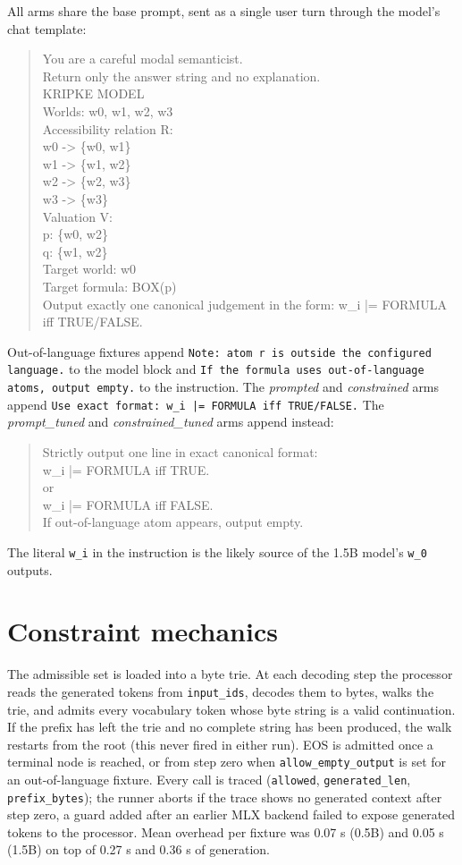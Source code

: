 \documentclass[11pt]{article}
\begin{document}
All arms share the base prompt, sent as a single user turn through the model's chat template:
\begin{quote}\small\ttfamily\raggedright\sloppy
You are a careful modal semanticist.\\
Return only the answer string and no explanation.\\[3pt]
KRIPKE MODEL\\
Worlds: w0, w1, w2, w3\\
Accessibility relation R:\\
w0 -> \{w0, w1\}\\
w1 -> \{w1, w2\}\\
w2 -> \{w2, w3\}\\
w3 -> \{w3\}\\[3pt]
Valuation V:\\
p: \{w0, w2\}\\
q: \{w1, w2\}\\[3pt]
Target world: w0\\
Target formula: BOX(p)\\[3pt]
Output exactly one canonical judgement in the form: w\_i |= FORMULA iff TRUE/FALSE.
\end{quote}
Out-of-language fixtures append \texttt{Note: atom r is outside the configured language.} to the model block and \texttt{If the formula uses out-of-language atoms, output empty.} to the instruction. The \emph{prompted} and \emph{constrained} arms append \texttt{Use exact format: w\_i |= FORMULA iff TRUE/FALSE.} The \emph{prompt\_tuned} and \emph{constrained\_tuned} arms append instead:
\begin{quote}\small\ttfamily\raggedright\sloppy
Strictly output one line in exact canonical format:\\
w\_i |= FORMULA iff TRUE.\\
or\\
w\_i |= FORMULA iff FALSE.\\
If out-of-language atom appears, output empty.
\end{quote}
The literal \texttt{w\_i} in the instruction is the likely source of the 1.5B model's \texttt{w\_0} outputs.

\section{Constraint mechanics}

The admissible set is loaded into a byte trie. At each decoding step the processor reads the generated tokens from \texttt{input\_ids}, decodes them to bytes, walks the trie, and admits every vocabulary token whose byte string is a valid continuation. If the prefix has left the trie and no complete string has been produced, the walk restarts from the root (this never fired in either run). EOS is admitted once a terminal node is reached, or from step zero when \texttt{allow\_empty\_output} is set for an out-of-language fixture. Every call is traced (\texttt{allowed}, \texttt{generated\_len}, \texttt{prefix\_bytes}); the runner aborts if the trace shows no generated context after step zero, a guard added after an earlier MLX backend failed to expose generated tokens to the processor. Mean overhead per fixture was 0.07 s (0.5B) and 0.05 s (1.5B) on top of 0.27 s and 0.36 s of generation.
\end{document}
